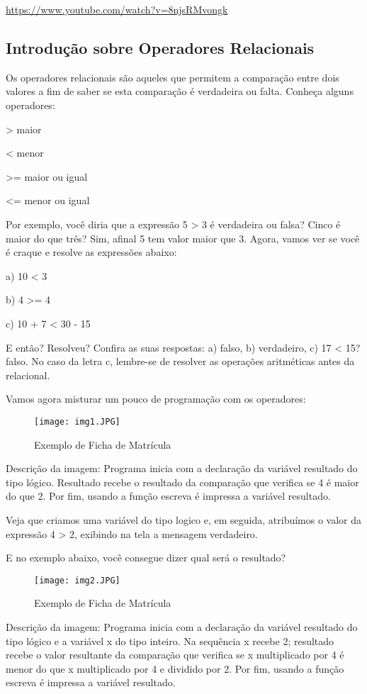 \documentclass{article}
\begin{document}
\href{https://www.youtube.com/watch?v=8njsRMvongk}{https://www.youtube.com/watch?v=8njsRMvongk}


\subsection{Introdução sobre Operadores Relacionais}
Os operadores relacionais são aqueles que permitem a comparação entre dois valores a fim de saber se esta comparação é verdadeira ou falta. Conheça alguns operadores:

> maior

< menor

>= maior ou igual

<= menor ou igual

Por exemplo, você diria que a expressão 5 > 3 é verdadeira ou falsa? Cinco é maior do que três? Sim, afinal 5 tem valor maior que 3. Agora, vamos ver se você é craque e resolve as expressões abaixo:

a) 10 < 3

b) 4 >= 4

c) 10 + 7 < 30 - 15

E então? Resolveu? Confira as suas respostas: a) falso, b) verdadeiro, c) 17 < 15? falso. No caso da letra c, lembre-se de resolver as operações aritméticas antes da relacional.

Vamos agora misturar um pouco de programação com os operadores:
\begin{figure}[h]
    \centering
    \texttt{[image: img1.JPG]}
    \caption{Exemplo de Ficha de Matrícula}
    \label{fig:img1}
\end{figure}

Descrição da imagem: Programa inicia com a declaração da variável resultado do tipo lógico. Resultado recebe o resultado da comparação que verifica se 4 é maior do que 2. Por fim, usando a função escreva é impressa a variável resultado.

Veja que criamos uma variável do tipo logico e, em seguida, atribuímos o valor da expressão 4 > 2, exibindo na tela a mensagem verdadeiro.

E no exemplo abaixo, você consegue dizer qual será o resultado?
\begin{figure}[h]
    \centering
    \texttt{[image: img2.JPG]}
    \caption{Exemplo de Ficha de Matrícula}
    \label{fig:img2}
\end{figure}
Descrição da imagem: Programa inicia com a declaração da variável resultado do tipo lógico e a variável x do tipo inteiro. Na sequência x recebe 2; resultado recebe o valor resultante da comparação que verifica se x multiplicado por 4 é menor do que x multiplicado por 4 e dividido por 2. Por fim, usando a função escreva é impressa a variável resultado.
\end{document}
